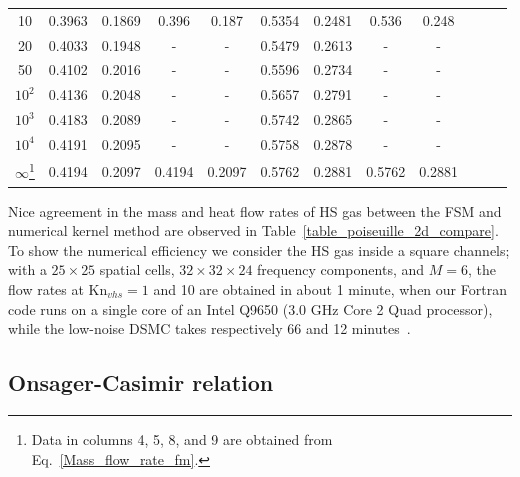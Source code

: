 \begin{table}[t]
\begin{tabular}{cccccccccccc}
			10     & 0.3963 & 0.1869   & 0.396   & 0.187  & 0.5354  & 0.2481    & 0.536   & 0.248  \\
			20     & 0.4033 & 0.1948   & -       &-       & 0.5479  & 0.2613    & -       & -  \\
			50     & 0.4102 & 0.2016   & -       &-       & 0.5596  & 0.2734    & -       & -  \\
			$10^2$ & 0.4136 & 0.2048   & -       &-       & 0.5657  & 0.2791    & -       & -  \\
			$10^3$ & 0.4183 & 0.2089   & -       &-       & 0.5742  & 0.2865    & -       & - \\   
			$10^4$ & 0.4191 & 0.2095   & -       &-       & 0.5758  & 0.2878    & -       & - \\   
			$\infty$\footnote{Data in columns 4, 5, 8, and 9 are obtained from Eq.~\eqref{Mass_flow_rate_fm}.} & 0.4194 & 0.2097   & 0.4194  & 0.2097 & 0.5762  & 0.2881    & 0.5762  & 0.2881  \\
			\hline
		\end{tabular}\par
		\vspace{-0.75\skip\footins}
		\renewcommand{\footnoterule}{}
\end{table}



Nice agreement in the mass and heat flow rates of HS gas between the FSM and numerical kernel method   are observed in Table~\ref{table_poiseuille_2d_compare}. To show the numerical efficiency we consider the HS gas inside a square channels; with a $25\times25$ spatial cells, $32\times32\times24$ frequency components, and $M=6$, the flow rates at $\text{Kn}_{vhs}=1$ and 10 are obtained in about 1 minute, when our Fortran code runs on a single core of an Intel Q9650 (3.0 GHz Core 2 Quad processor), while the low-noise DSMC  takes respectively 66 and 12 minutes~\cite{Doi2010,Radtke2011}. 








\subsection{Onsager-Casimir relation} 


